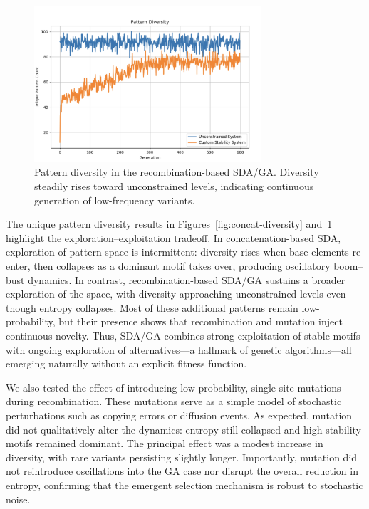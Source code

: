\documentclass[life,article,submit,pdftex,moreauthors]{Definitions/mdpi}
\begin{document}
\begin{figure}[H]
    \centering
    \includegraphics[width=0.75\textwidth]{SDA-GA-diversity.png}
    \caption{Pattern diversity in the recombination-based SDA/GA. Diversity steadily rises toward unconstrained levels, indicating continuous generation of low-frequency variants.}
    \label{fig:ga-diversity}
\end{figure}

The unique pattern diversity results in Figures~\ref{fig:concat-diversity} and~\ref{fig:ga-diversity} highlight the exploration--exploitation tradeoff. 
In concatenation-based SDA, exploration of pattern space is intermittent: 
diversity rises when base elements re-enter, then collapses as a dominant 
motif takes over, producing oscillatory boom--bust dynamics. In contrast, 
recombination-based SDA/GA sustains a broader exploration of the space, 
with diversity approaching unconstrained levels even though entropy 
collapses. Most of these additional patterns remain low-probability, but 
their presence shows that recombination and mutation inject continuous 
novelty. Thus, SDA/GA combines strong exploitation of stable motifs with 
ongoing exploration of alternatives---a hallmark of genetic algorithms---all 
emerging naturally without an explicit fitness function.


We also tested the effect of introducing low-probability, single-site mutations during recombination. 
These mutations serve as a simple model of stochastic perturbations such as copying errors or 
diffusion events. As expected, mutation did not qualitatively alter the dynamics: entropy still 
collapsed and high-stability motifs remained dominant. The principal effect was a modest increase 
in diversity, with rare variants persisting slightly longer. Importantly, mutation did not reintroduce 
oscillations into the GA case nor disrupt the overall reduction in entropy, confirming that the 
emergent selection mechanism is robust to stochastic noise.
\end{document}
